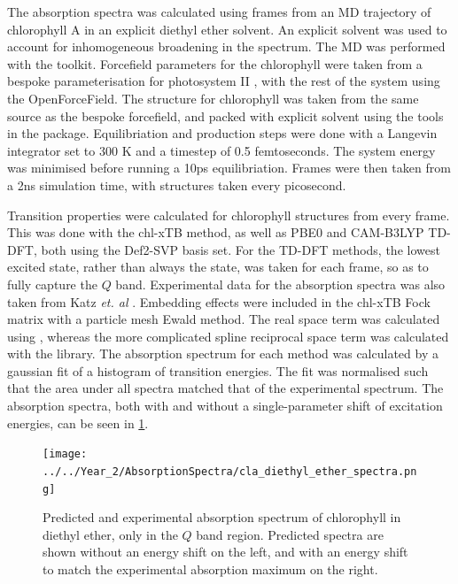 The absorption spectra was calculated using frames from an MD trajectory of chlorophyll
A in an explicit diethyl ether solvent. An explicit solvent was used to account
for inhomogeneous broadening in the spectrum. The MD was performed with the
 toolkit. Forcefield parameters for the chlorophyll were taken from
a bespoke parameterisation for photosystem II \cite{Zhang2012}, with the rest of
the system using the OpenForceField. The structure for chlorophyll was taken from
the same source as the bespoke forcefield, and packed with explicit solvent using
the tools in the  package. Equilibriation and production steps were 
done with a Langevin integrator set to 300 K  and a timestep of 0.5 femtoseconds.
The system energy was minimised before running a 10ps equilibriation. Frames were
then taken from a 2ns simulation time, with structures taken every picosecond.

Transition properties were calculated for chlorophyll structures from every frame.
This was done with the chl-xTB method, as well as PBE0 and CAM-B3LYP TD-DFT, both
using the Def2-SVP basis set. For the TD-DFT methods, the lowest excited state, 
rather than always the \Qy state, was taken for each frame, so as to fully capture 
the $Q$ band. Experimental data for the absorption spectra was also taken from Katz 
\emph{et. al} \cite{Strain1963}. Embedding effects were included in the chl-xTB
Fock matrix with a particle mesh Ewald method. The real space term was calculated
using , whereas the more complicated spline reciprocal space term was
calculated with the  library. The absorption spectrum for each method
was calculated by a gaussian fit of a histogram of transition  energies. The fit
was normalised such that the area under all spectra matched that of the experimental 
spectrum. The absorption spectra, both with and without a single-parameter shift
of excitation energies, can be seen in \ref{fig:chl_diethyl_ether}.

\begin{figure}
    \centering
    \texttt{[image: ../../Year\_2/AbsorptionSpectra/cla\_diethyl\_ether\_spectra.png]}
    \label{fig:chl_diethyl_ether}
    \caption{Predicted and experimental absorption spectrum of chlorophyll in diethyl 
    ether, only in the $Q$ band region. Predicted spectra are shown without an energy
    shift on the left, and with an energy shift to match the experimental absorption
    maximum on the right.}
\end{figure}

